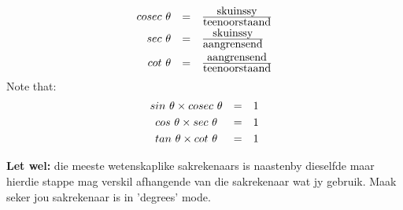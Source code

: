 \begin{equation*}
\begin{array}{ccc}\hfill cosec~\theta & =& \frac{\mbox{skuinssy}}{\mbox{teenoorstaand}}\hfill \vspace{3pt}\\
 \hfill sec~\theta & =& \frac{\mbox{skuinssy}}{\mbox{aangrensend}}\hfill \vspace{3pt}\\
 \hfill cot~\theta & =& \frac{\mbox{aangrensend}}{\mbox{teenoorstaand}}\hfill 
\end{array}
\end{equation*}
Note that:
\begin{equation*}
\begin{array}{ccc}sin~\theta \times cosec~\theta & =& 1 \vspace{3pt}\\
 cos~\theta \times sec~\theta & =& 1 \vspace{3pt}\\
tan~\theta \times cot~\theta & =& 1
\end{array}
\end{equation*}


% 
% 
\textbf{Let wel: }die meeste wetenskaplike sakrekenaars is naastenby dieselfde maar hierdie stappe mag verskil afhangende van die sakrekenaar wat jy gebruik. Maak seker jou sakrekenaar is in 'degrees' mode. 

